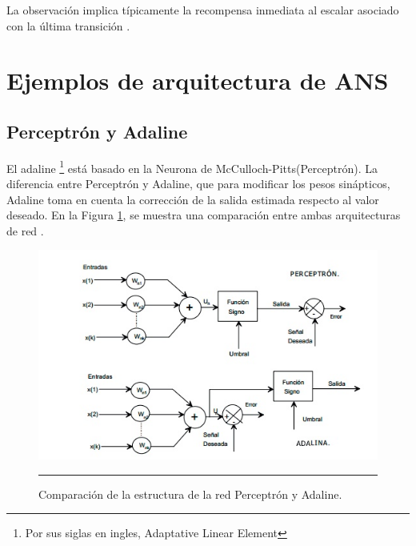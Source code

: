 \documentclass[11pt,titlepage]{report}
\begin{document}
La observación implica típicamente la recompensa inmediata al escalar asociado con la última transición \cite{Int08}.

\section{Ejemplos de arquitectura de ANS}
\subsection{Perceptrón y Adaline}
El adaline \footnote{Por sus siglas en ingles, Adaptative Linear Element} está basado en la Neurona de McCulloch-Pitts(Perceptrón). 
La diferencia entre Perceptrón y Adaline, que para modificar los pesos sinápticos, Adaline toma en cuenta la corrección de la salida estimada respecto al valor deseado. En la Figura \ref{03}, se muestra una comparación entre ambas arquitecturas de red \cite{Int08}.
\begin{figure}[h]
	\centering
	\includegraphics[scale=1]{Pic/red02}
\caption{Comparación de la estructura de la red Perceptrón y Adaline.\cite{Lib04}}
\label{03}
\hrule
\end{figure}
\end{document}
